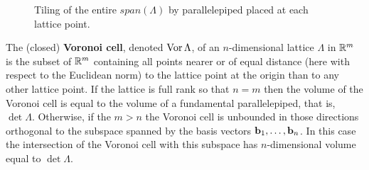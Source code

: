 \begin{figure}[t]
  \centering
  \caption{Tiling of the entire $span(\Lambda)$ by parallelepiped placed at each lattice point.}
  \label{fig:ch2-parallelepiped-tiling}
\end{figure}


The (closed) \textbf{Voronoi cell}, denoted $\operatorname{Vor}\Lambda$, of an $n$-dimensional lattice $\Lambda$ in ${\mathbb R}^m$ is the subset of ${\mathbb R}^m$ containing all points nearer or of equal distance (here with respect to the Euclidean norm) to the lattice point at the origin than to any other lattice point. If the lattice is full rank so that $n=m$ then the volume of the Voronoi cell is equal to the volume of a fundamental parallelepiped, that is, $\det\Lambda$.  Otherwise, if the $m > n$ the Voronoi cell is unbounded in those directions orthogonal to the subspace spanned by the basis vectors $\mathbf{b}_1,\dots,\mathbf{b}_n$.  In this case the intersection of the Voronoi cell with this subspace has $n$-dimensional volume equal to $\det\Lambda$. 

